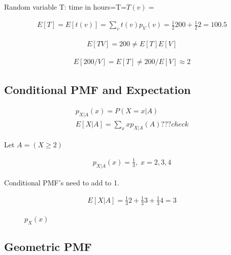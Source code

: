 \documentclass{article}
\begin{document}

Random variable T: time in hours=T=$T(v)=$

\begin{align*}
E[T] = E[t(v)] = \sum_v t(v)p_V(v) = \frac{1}{2}200 + \frac{1}{2}2 = 100.5
\end{align*}

\begin{align*}
E[TV] = 200 \ne E[T]E[V]
\end{align*}

\begin{align*}
E[200/V] = E[T] \ne 200/E[V] \approx 2
\end{align*}

\subsection{Conditional PMF and Expectation}


\begin{align*}
p_{X|A}(x) = P(X=x|A)\\
E[X|A] = \sum_x x p_{X|A}(A) ???check
\end{align*}

Let $A=(X \ge 2)$

\begin{align*}
p_{X|A}(x) = \frac{1}{3},\; x=2,3,4
\end{align*}

Conditional PMF's need to add to 1.

\begin{align*}
E[X|A] = \frac{1}{3}2 + \frac{1}{3}3 + \frac{1}{3}4=3
\end{align*}


\begin{figure}[h]
\centering
{}
\caption{$p_X(x)$}
\end{figure}


\subsection{Geometric PMF}
\end{document}
